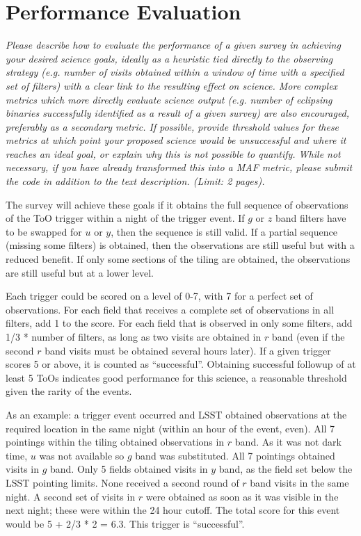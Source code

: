 \documentclass[11pt]{article}
\begin{document}
\section{Performance Evaluation}
\begin{footnotesize}
{\it Please describe how to evaluate the performance of a given survey in achieving your desired
science goals, ideally as a heuristic tied directly to the observing strategy (e.g. number of visits obtained
within a window of time with a specified set of filters) with a clear link to the resulting effect on science.
More complex metrics which more directly evaluate science output (e.g. number of eclipsing binaries successfully
identified as a result of a given survey) are also encouraged, preferably as a secondary metric.
If possible, provide threshold values for these metrics at which point your proposed science would be unsuccessful 
and where it reaches an ideal goal, or explain why this is not possible to quantify. While not necessary, 
if you have already transformed this into a MAF metric, please submit the code in addition to the text description. (Limit: 2 pages).}
\end{footnotesize}

The survey will achieve these goals if it obtains the full sequence of observations of the ToO trigger within a night of the trigger event. If $g$ or $z$ band filters 
have to be swapped for $u$ or $y$, then the sequence is still valid. If a partial sequence (missing some filters) is obtained, then the observations are still useful 
but with a reduced benefit. If only some sections of the tiling are obtained, the observations are still useful but at a lower level. 

Each trigger could be scored on a level of 0-7, with 7 for a perfect set of observations. For each field that receives a complete set of observations in all filters, add 1 to
the score. For each field that is observed in only some filters, add 1/3 * number of filters, as long as two visits are obtained in $r$ band (even if the second
$r$ band visits must be obtained several hours later). If a given trigger scores 5 or above, it is counted as ``successful''. Obtaining 
successful followup of at least 5 ToOs indicates good performance for this science, a reasonable threshold given the rarity of the events.

As an example: a trigger event occurred and LSST obtained observations at the required location in the same night (within an hour of the event, even). All 7 pointings 
within the tiling obtained observations in $r$ band. As it was not dark time, $u$ was not available so $g$ band was substituted. All 7 pointings obtained visits in $g$ 
band. Only 5 fields obtained visits in $y$ band, as the field set below the LSST pointing limits. None received a second round of $r$ band visits in the same night.
A second set of visits in $r$ were obtained as soon as it was visible in the next night; these were within the 24 hour cutoff. 
The total score for this event would be 5 + 2/3 * 2 = 6.3. This trigger is ``successful''.  
\end{document}
